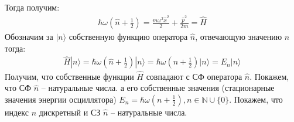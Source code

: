 Тогда получим:
\begin{gather*}
\hbar\omega\left(\hat{n}+\frac{1}{2}\right)
=
\frac{m\omega^2\hat{x}^2}{2}+\frac{\hat{p}^2}{2m}
=
\hat{H}
\end{gather*}
Обозначим за $|n\rangle$ собственную функцию оператора $\hat{n}$, отвечающую значению $n$ тогда:
\begin{gather*}
\hat{H}|n\rangle
=
\hbar\omega\left(\hat{n}+\frac{1}{2}\right)|n\rangle
=
\hbar\omega\left(n+\frac{1}{2}\right)|n\rangle
=
E_n|n\rangle
\end{gather*}
Получим, что собственные функции $\hat{H}$ совпадают с СФ оператора $\hat{n}$. Покажем, что СФ $\hat{n}$ -- натуральные числа. а его собственные значения (стационарные значения энергии осциллятора) $E_n=\hbar\omega\left(n+\frac{1}{2}\right),n\in\mathbb{N}\cup\{0\}$. Покажем, что индекс $n$ дискретный и СЗ $\hat{n}$ -- натуральные числа.

